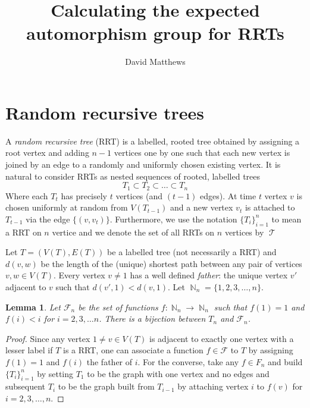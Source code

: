 \documentclass[10pt]{amsart} %
\title{Calculating the expected automorphism group for RRTs}
\author{David Matthews}
\newtheorem{lem}[thm]{Lemma}
\theoremstyle{definition}
\DeclareMathOperator{\T}{\mathcal{T}}
\DeclareMathOperator{\N}{\mathbb{N}}
\begin{document}
\maketitle


\section{Random recursive trees}


A \emph{random recursive tree} (RRT) is a labelled, rooted tree obtained by assigning a root vertex and adding $n-1$ vertices one by one such that each new vertex is joined by an edge to a randomly and uniformly chosen existing vertex. It is natural to consider RRTs as nested sequences of rooted, labelled trees
\[T_{1} \subset T_{2} \subset \dots \subset T_{n}\]
Where each $T_{t}$ has precisely $t$ vertices (and $(t-1)$ edges).  At time $t$ vertex $v$ is chosen uniformly at random from $V(T_{t-1})$ and a new vertex $v_{t}$ is attached to $T_{t-1}$ via the edge $\{(v,v_{t})\}$. Furthermore, we use the notation $\{T_i\}_{i=1}^{n}$ to mean a RRT on $n$ vertice and we denote the set of all RRTs on $n$ vertices by $\T$

Let $T = (V(T),E(T))$ be a labelled tree (not necessarily a RRT) and $d(v,w)$ be the length of the (unique) shortest path between any pair of vertices $v,w \in V(T)$.  Every vertex $v \neq 1 $ has a well defined \emph{father}: the unique vertex $v'$ adjacent to $v$ such that $d(v',1)< d(v,1)$.   Let $\N_n = \{1,2,3,\dots,n\}$. 

\begin{lem}
 Let $\mathcal{F}_n$ be the set of functions $f: \N_n \longrightarrow \N_n$ such that $f(1) = 1$ and $f(i) <i$ for $i = 2,3,\dots n$.  There is a bijection between $T_n$ and $\mathcal{F}_n$.
\end{lem}

\begin{proof}  Since any vertex $1 \neq v \in V(T)$ is adjacent to exactly one vertex with a lesser label if $T$ is a RRT, 
one can associate a function $f \in \mathcal{F}$ to $T$ by assigning  $f(1) =1$ and $f(i)$ the father of $i$. 
For the converse, take any $f \in {F}_n$ and build $\{T_{i}\}_{i=1}^{n}$ by setting $T_1$ to be the graph with one vertex and no edges and subsequent $T_i$ to be the graph built from $T_{i-1}$ by attaching vertex $i$ to $f(v)$ for $i = 2,3,\dots,n$.   
\end{proof}
\end{document}
